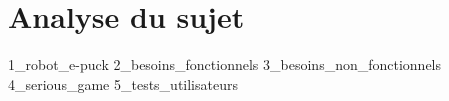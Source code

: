 \section{Analyse du sujet}

{1_robot_e-puck}
{2_besoins_fonctionnels}
{3_besoins_non_fonctionnels}
{4_serious_game}
{5_tests_utilisateurs}